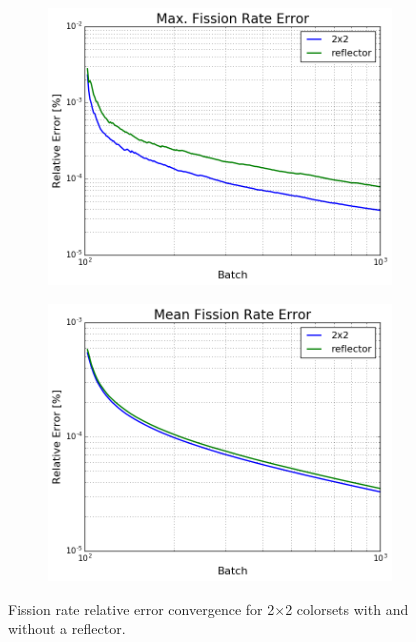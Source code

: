 \begin{figure}[h!]
\centering
\begin{subfigure}{0.5\textwidth}
  \centering
  \includegraphics[width=\linewidth]{figures/benchmarks/fission-rates/fiss-conv-max-multi-assms}
  \caption{}
  \label{fig:chap7-fiss-rate-max-conv-multi-assms}
\end{subfigure}%
\begin{subfigure}{0.5\textwidth}
  \centering
  \includegraphics[width=\linewidth]{figures/benchmarks/fission-rates/fiss-conv-mean-multi-assms}
  \caption{}
  \label{fig:chap7-fiss-rate-max-conv-multi-assms}
\end{subfigure}%
\caption[Fission rate error convergence for 2$\times$2 colorsets]{Fission rate relative error convergence for 2$\times$2 colorsets with and without a reflector.}
\label{fig:chap7-fiss-rates-conv-assm}
\end{figure}


